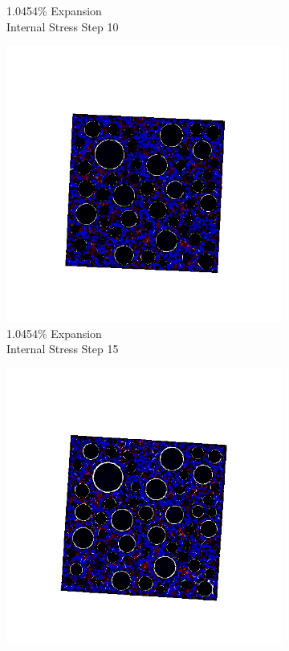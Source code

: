 \begin{figure}[ht!]
\begin{subfigure}{.25\textwidth}
      \caption{1.0454\% Expansion\\Internal Stress Step 10}
    \end{subfigure}%
    \begin{subfigure}{.25\textwidth}
      \centering
      \includegraphics[width=1.0\linewidth]{Files/exp_3D/DEF/A30X-1C_4_s15.png}
      \caption{1.0454\% Expansion\\Internal Stress Step 15}
    \end{subfigure}%
    \begin{subfigure}{.25\textwidth}
      \centering
      \includegraphics[width=1.0\linewidth]{Files/exp_3D/DEF/A30X-1C_4_stress.png}

\end{subfigure}
\end{figure}
